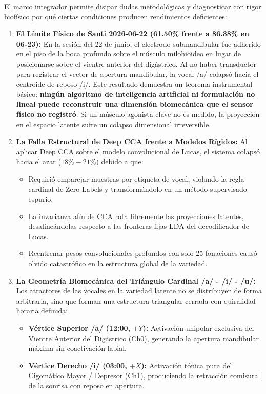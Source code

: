 \documentclass[11pt,a4paper,openany]{book}
\theoremstyle{definition}
\begin{document}
El marco integrador permite disipar dudas metodológicas y diagnosticar con rigor biofísico por qué ciertas condiciones producen rendimientos deficientes:
\begin{enumerate}
    \item \textbf{El Límite Físico de Santi 2026-06-22 (61.50\% frente a 86.38\% en 06-23):}
    En la sesión del 22 de junio, el electrodo submandibular fue adherido en el piso de la boca profundo sobre el músculo milohioideo en lugar de posicionarse sobre el vientre anterior del digástrico. Al no haber transductor para registrar el vector de apertura mandibular, la vocal /a/ colapsó hacia el centroide de reposo /i/. Este resultado demuestra un teorema instrumental básico: \textbf{ningún algoritmo de inteligencia artificial ni formulación no lineal puede reconstruir una dimensión biomecánica que el sensor físico no registró}. Si un músculo agonista clave no es medido, la proyección en el espacio latente sufre un colapso dimensional irreversible.
    \item \textbf{La Falla Estructural de Deep CCA frente a Modelos Rígidos:}
    Al aplicar Deep CCA sobre el modelo convolucional de Lucas, el sistema colapsó hacia el azar ($18\% - 21\%$) debido a que:
    \begin{itemize}
        \item Requirió emparejar muestras por etiqueta de vocal, violando la regla cardinal de Zero-Labels y transformándolo en un método supervisado espurio.
        \item La invarianza afín de CCA rota libremente las proyecciones latentes, desalineándolas respecto a las fronteras fijas LDA del decodificador de Lucas.
        \item Reentrenar pesos convolucionales profundos con solo 25 fonaciones causó olvido catastrófico en la estructura global de la variedad.
    \end{itemize}
    \item \textbf{La Geometría Biomecánica del Triángulo Cardinal /a/ - /i/ - /u/:}
    Los atractores de las vocales en la variedad latente no se distribuyen de forma arbitraria, sino que forman una estructura triangular cerrada con quiralidad horaria definida:
    \begin{itemize}
        \item \textbf{Vértice Superior /a/ (12:00, $+Y$):} Activación unipolar exclusiva del Vientre Anterior del Digástrico (Ch0), generando la apertura mandibular máxima sin coactivación labial.
        \item \textbf{Vértice Derecho /i/ (03:00, $+X$):} Activación tónica pura del Cigomático Mayor / Depresor (Ch1), produciendo la retracción comisural de la sonrisa con reposo en apertura.

\end{itemize}
\end{enumerate}
\end{document}
